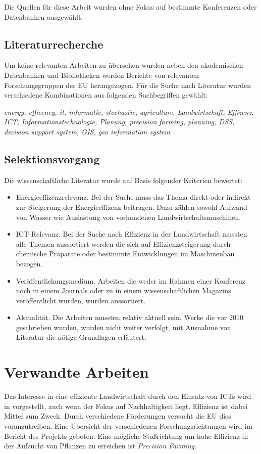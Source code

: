 Die Quellen für diese Arbeit wurden ohne Fokus auf bestimmte Konferenzen oder Datenbanken ausgewählt. 

\subsection{Literaturrecherche}
Um keine relevanten Arbeiten zu übersehen wurden neben den akademischen Datenbanken und Bibliotheken werden Berichte von relevanten Forschungsgruppen der EU herangezogen. Für die Suche nach Literatur wurden verschiedene Kombinationen aus folgenden Suchbegriffen gewählt:

\textit{energy, efficency, it, informatic, stochastic, agriculture, Landwirtschaft, Effizenz, ICT, Informationstechnologie, Planung, precision farming, planning, DSS, decision support system, GIS, geo information system}

\subsection{Selektionsvorgang}
Die wissenschaftliche Literatur wurde auf Basis folgender Kriterien bewertet:
\begin{itemize}
  \item Energieeffizenzrelevanz. Bei der Suche muss das Thema direkt oder indirekt zur Steigerung der Energieeffizenz beitragen. Dazu zählen sowohl Aufwand von Wasser wie Auslastung von vorhandenen Landwirtschaftsmaschinen.
  \item ICT-Relevanz. Bei der Suche nach Effizienz in der Landwirtschaft mussten alle Themen aussortiert werden die sich auf Effizienzsteigerung durch chemische Präparate oder bestimmte Entwicklungen im Maschinenbau bezogen.
  \item Veröffentlichungsmedium. Arbeiten die weder im Rahmen einer Konferenz noch in einem Journals oder zu in einem wissenschaftlichen Magazins veröffentlicht wurden, wurden aussortiert.
  \item Aktualität. Die Arbeiten mussten relativ aktuell sein. Werke die vor 2010 geschrieben wurden, wurden nicht weiter verfolgt, mit Ausnahme von Literatur die nötige Grundlagen erläutert.
\end{itemize}

\section{Verwandte Arbeiten}
Das Interesse in eine effiziente Landwirtschaft durch den Einsatz von ICTs wird in \cite{jour:Andreopoulou2012} vorgestellt, auch wenn der Fokus auf Nachhaltigkeit liegt. Effizienz ist dabei Mittel zum Zweck. Durch verschiedene Förderungen versucht die EU dies voranzutreiben. Eine Übersicht der verschiedenen Forschungsrichtungen wird im Bericht des Projekts \cite{misc:Mikkola2013} geboten. Eine mögliche Stoßrichtung um hohe Effizienz in der Aufzucht von Pflanzen zu erreichen ist \textit{Precision Farming}\cite{jour:Auernhammer2001}.


